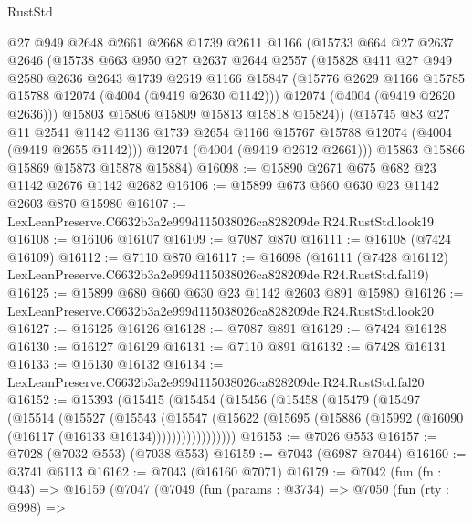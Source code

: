\begin{lexlean}{RustStd}
\begin{coremodule}
        @27
        @949
        @2648
        @2661
        @2668
        @1739
        @2611
        @1166
        (@15733
          @664
          @27
          @2637
          @2646
          (@15738
            @663
            @950
            @27
            @2637
            @2644
            @2557
            (@15828
              @411
              @27
              @949
              @2580
              @2636
              @2643
              @1739
              @2619
              @1166
              @15847
              (@15776 @2629 @1166 @15785 @15788 @12074 (@4004 (@9419 @2630 @1142)))
              @12074
              (@4004 (@9419 @2620 @2636)))
            @15803
            @15806
            @15809
            @15813
            @15818
            @15824))
        (@15745
          @83
          @27
          @11
          @2541
          @1142
          @1136
          @1739
          @2654
          @1166
          @15767
          @15788
          @12074
          (@4004 (@9419 @2655 @1142)))
        @12074
        (@4004 (@9419 @2612 @2661)))
      @15863
      @15866
      @15869
      @15873
      @15878
      @15884)
@16098 := @15890 @2671 @675 @682 @23 @1142 @2676 @1142 @2682
@16106 := @15899 @673 @660 @630 @23 @1142 @2603 @870 @15980
@16107 := LexLeanPreserve.C6632b3a2e999d115038026ca828209de.R24.RustStd.look19
@16108 := @16106 @16107
@16109 := @7087 @870
@16111 := @16108 (@7424 @16109)
@16112 := @7110 @870
@16117 := @16098
    (@16111 (@7428 @16112) LexLeanPreserve.C6632b3a2e999d115038026ca828209de.R24.RustStd.fal19)
@16125 := @15899 @680 @660 @630 @23 @1142 @2603 @891 @15980
@16126 := LexLeanPreserve.C6632b3a2e999d115038026ca828209de.R24.RustStd.look20
@16127 := @16125 @16126
@16128 := @7087 @891
@16129 := @7424 @16128
@16130 := @16127 @16129
@16131 := @7110 @891
@16132 := @7428 @16131
@16133 := @16130 @16132
@16134 := LexLeanPreserve.C6632b3a2e999d115038026ca828209de.R24.RustStd.fal20
@16152 := @15393
    (@15415
      (@15454
        (@15456
          (@15458
            (@15479
              (@15497
                (@15514
                  (@15527
                    (@15543
                      (@15547
                        (@15622
                          (@15695 (@15886 (@15992 (@16090 (@16117 (@16133 @16134)))))))))))))))))
@16153 := @7026 @553
@16157 := @7028 (@7032 @553) (@7038 @553)
@16159 := @7043 (@6987 @7044)
@16160 := @3741 @6113
@16162 := @7043 (@16160 @7071)
@16179 := @7042
    (fun (fn : @43) =>
    @16159
      (@7047
        (@7049
          (fun (params : @3734) =>
          @7050
            (fun (rty : @998) =>

\end{coremodule}
\end{lexlean}
